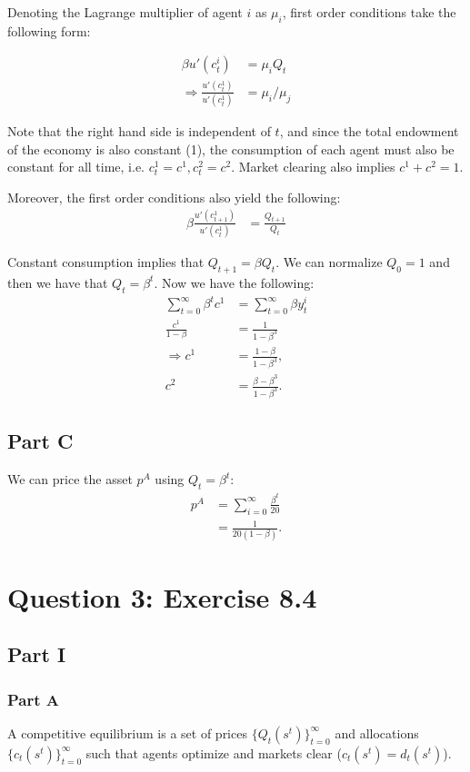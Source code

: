 \documentclass[11pt]{article} %
\begin{document}
Denoting the Lagrange multiplier of agent $i$ as $\mu_i$, first order conditions take the following form:

\begin{align*}
\beta u'(c_t^i) &= \mu_i Q_t\\
\Rightarrow \frac{u'(c_t^1)}{u'(c_t^1)} &= \mu_i/\mu_j
\end{align*}

Note that the right hand side is independent of $t$, and since the total endowment of the economy is also constant (1), the consumption of each agent must also be constant for all time, i.e. $c_t^1 = c^1, c_t^2 = c^2.$ Market clearing also implies $c^1+c^2 = 1.$

Moreover, the first order conditions also yield the following:
\begin{align*}
\beta\frac{u'(c_{t+1}^1)}{u'(c_{t}^1)} &= \frac{Q_{t+1}}{Q_t}
\end{align*}

Constant consumption implies that $Q_{t+1} = \beta Q_t$. We can normalize $Q_0 = 1$ and then we have that $Q_{t} = \beta^t$. Now we have the following:
\begin{align*}
\sum_{t=0}^{\infty}\beta^t c^1 &= \sum_{t=0}^{\infty}\beta y_{t}^i\\
\frac{c^1}{1-\beta} &= \frac{1}{1-\beta^3}\\
\Rightarrow c^1 &= \frac{1-\beta}{1-\beta^3},\\
c^2 &= \frac{\beta - \beta^3}{1-\beta^3}.
\end{align*}

\subsection{Part C}

We can price the asset $p^A$ using $Q_t = \beta^t$:
\begin{align*}
p^A &= \sum_{i=0}^{\infty}\frac{\beta^t}{20}\\
&= \frac{1}{20(1-\beta)}.
\end{align*}

\section{Question 3: Exercise 8.4}
\subsection{Part I}
\subsubsection{Part A}
A competitive equilibrium is a set of prices $\{Q_t(s^t)\}_{t=0}^{\infty}$ and allocations $\{c_t(s^t)\}_{t=0}^{\infty}$ such that agents optimize and markets clear ($c_t(s^t) =d_t(s^t)$).
\end{document}
